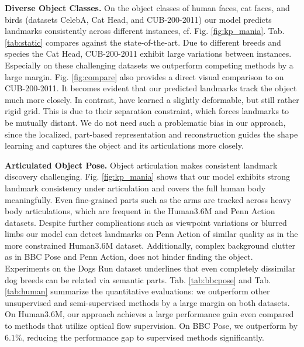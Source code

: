 	\textbf{Diverse Object Classes.}
	On the object classes of human faces, cat faces, and birds (datasets CelebA, Cat Head, and CUB-200-2011) our model predicts landmarks consistently across different instances, cf. Fig. \ref{fig:kp_mania}.
	Tab. \ref{tab:static} compares against the state-of-the-art. Due to different breeds and species the Cat Head, CUB-200-2011 exhibit large variations between instances. Especially on these challenging datasets we outperform competing methods by a large margin.
	Fig. \ref{fig:compare} also provides a direct visual comparison to \cite{Zhang:2018vz} on CUB-200-2011. It becomes evident that our predicted landmarks track the object much more closely. In contrast, \cite{Zhang:2018vz} have learned a slightly deformable, but still rather rigid grid.
	This is due to their separation constraint, which forces landmarks to be mutually distant. We do not need such a problematic bias in our approach, since the localized, part-based representation and reconstruction guides the shape learning and captures the object and its articulations more closely.
	


	\textbf{Articulated Object Pose.}
	Object articulation makes consistent landmark discovery challenging.
	Fig. \ref{fig:kp_mania} shows that our model exhibits strong landmark consistency under articulation and covers the full human body meaningfully.
	Even fine-grained parts such as the arms are tracked across heavy body articulations, which are frequent in the Human3.6M and Penn Action datasets.
    Despite further complications such as viewpoint variations or blurred limbs our model can detect landmarks on Penn Action of similar quality as in the more constrained Human3.6M dataset.
	Additionally, complex background clutter as in BBC Pose and Penn Action, does not hinder finding the object.
	Experiments on the Dogs Run dataset underlines that even completely dissimilar dog breeds can be related via semantic parts.
	Tab. \ref{tab:bbcpose} and Tab. \ref{tab:human} summarize the quantitative evaluations: we outperform other unsupervised and semi-supervised methods by a large margin on both datasets.
	On Human3.6M, our approach achieves a large performance gain even compared to methods that utilize optical flow supervision.
	On BBC Pose, we outperform \cite{Jakab:2018wc} by $6.1\%$, reducing the performance gap to supervised methods significantly.
